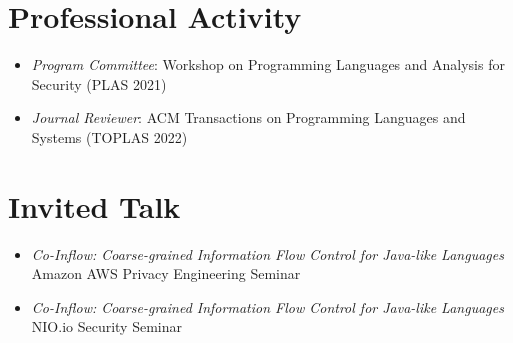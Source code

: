\documentclass[11pt]{article}
\begin{document}



\section{Professional Activity}
\begin{itemize}
  \item \emph{Program Committee}: Workshop on Programming Languages and Analysis for Security (PLAS 2021)
\item \emph{Journal Reviewer}: ACM Transactions on Programming Languages and Systems (TOPLAS 2022)
\end{itemize}

\section{Invited Talk}


\begin{itemize}
\item \emph{Co-Inflow: Coarse-grained Information Flow Control for Java-like Languages} \\
  Amazon AWS Privacy Engineering Seminar
  

\item   \emph{Co-Inflow: Coarse-grained Information Flow Control for Java-like Languages} \\
  NIO.io Security Seminar 

\end{itemize}


\end{document}

